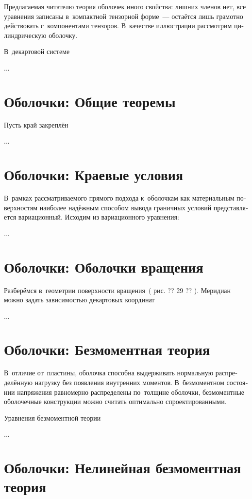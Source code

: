 \begin{otherlanguage}{russian}
Предлагаемая читателю теория оболочек иного свойства: лишних членов нет, все уравнения записаны в~компактной тензорной форме~--- остаётся лишь грамотно действовать с~компонентами тензоров. В~качестве иллюстрации рассмотрим цилиндрическую оболочку.

В~декартовой системе

...



\section{Оболочки: Общие теоремы}

Пусть край закреплён

...



\section{Оболочки: Краевые условия}

В~рамках рассматриваемого прямого подхода к~оболочкам как материальным поверхностям наиболее надёжным способом вывода граничных условий представляется вариационный. Исходим из вариационного уравнения:

...



\section{Оболочки: Оболочки вращения}

Разберёмся в~геометрии поверхности вращения~( рис. ?? 29 ?? ). Меридиан можно задать зависимостью декартовых координат

...



\section{Оболочки: Безмоментная теория}

В~отличие от~пластины, оболочка способна выдерживать нормальную распределённую нагрузку без появления внутренних моментов. В~безмоментном состоянии напряжения равномерно распределены по~толщине оболочки, безмоментные оболочечные конструкции можно считать оптимально спроектированными.

Уравнения безмоментной теории

...



\section{Оболочки: Нелинейная безмоментная теория}


\end{otherlanguage}
